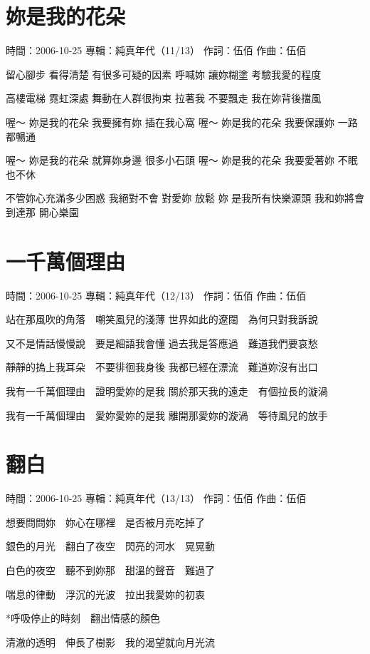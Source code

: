 \documentclass[UTF8,a4paper,oneside,twocolumn,12pt]{ctexbook}
\newcommand{\infopair}[2]{\textbullet #1：#2}
\newcommand{\zc}[1][伍佰]{\infopair{作詞}{#1}}
\newcommand{\zq}[1][伍佰]{\infopair{作曲}{#1}}
\newcommand{\zj}[1]{\infopair{專輯}{#1}}
\newcommand{\sj}[1]{\infopair{時間}{#1}}
\newenvironment{info}{\begin{flushleft}\kaishu
	}
	{\end{flushleft}\normalsize\yahei\par}
\newenvironment{lyric}{
	}
{}
\begin{document}
\section{妳是我的花朵}
\begin{info}
	\sj{2006-10-25}
	\zj{純真年代（11/13）}
	\zc
	\zq
\end{info}
\begin{lyric}
	留心腳步 看得清楚 有很多可疑的因素
	呼喊妳 讓妳糊塗 考驗我愛的程度

	高樓電梯 霓虹深處 舞動在人群很拘束
	拉著我 不要飄走 我在妳背後擋風

	喔～ 妳是我的花朵 我要擁有妳 插在我心窩
	喔～ 妳是我的花朵 我要保護妳 一路都暢通

	喔～ 妳是我的花朵 就算妳身邊 很多小石頭
	喔～ 妳是我的花朵 我要愛著妳 不眠也不休

	不管妳心充滿多少困惑 我絕對不會 對愛妳 放鬆
	妳 是我所有快樂源頭 我和妳將會 到達那 開心樂園
\end{lyric}

\section{一千萬個理由}
\begin{info}
	\sj{2006-10-25}
	\zj{純真年代（12/13）}
	\zc
	\zq
\end{info}
\begin{lyric}
	站在那風吹的角落　嘲笑風兒的淺薄
	世界如此的遼闊　為何只對我訴說

	又不是情話慢慢說　要是細語我會懂
	過去我是答應過　難道我們要哀愁

	靜靜的摀上我耳朵　不要徘徊我身後
	我都已經在漂流　難道妳沒有出口

	我有一千萬個理由　證明愛妳的是我
	關於那天我的遠走　有個拉長的漩渦

	我有一千萬個理由　愛妳愛妳的是我
	離開那愛妳的漩渦　等待風兒的放手
\end{lyric}

\section{翻白}
\begin{info}
	\sj{2006-10-25}
	\zj{純真年代（13/13）}
	\zc
	\zq
\end{info}
\begin{lyric}
	想要問問妳　妳心在哪裡　是否被月亮吃掉了

	銀色的月光　翻白了夜空　閃亮的河水　晃晃動

	白色的夜空　聽不到妳那　甜溫的聲音　難過了

	喘息的律動　浮沉的光波　拉出我愛妳的初衷

	*呼吸停止的時刻　翻出情感的顏色

	清澈的透明　伸長了樹影　我的渴望就向月光流
\end{lyric}
\end{document}
